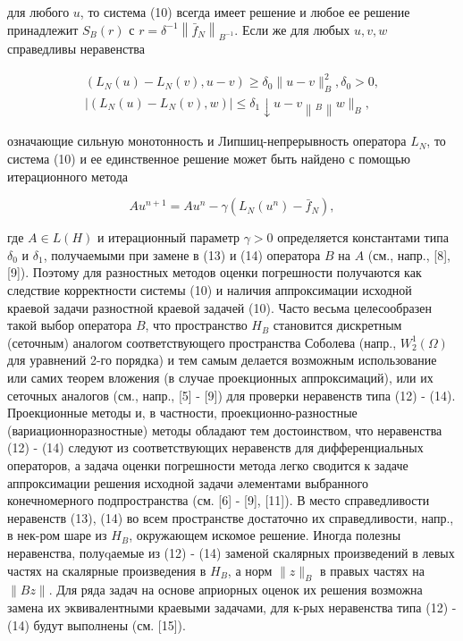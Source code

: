 \documentclass[10pt]{article}
\begin{document}
для любого $u$, то система (10) всегда имеет решение и любое ее решение принадлежит $S_{B}(r)$ с $r=\delta^{-1}\left\|\bar{f}_{N}\right\|_{B^{-1}}$. Если же для любых $u, v, w$ справедливы неравенства



\[

\begin{gathered}

\left(L_{N}(u)-L_{N}(v), u-v\right) \geqslant \delta_{0}\|u-v\|_{B}^{2}, \delta_{0}>0, \\

\left|\left(L_{N}(u)-L_{N}(v), w\right)\right| \leqslant \delta_{1} \downarrow u-v\left\|_{B}\right\| w \|_{B},

\end{gathered}

\]



означающие сильную монотонность и Липшиц-непрерывность оператора $L_{N}$, то система (10) и ее единственное решение может быть найдено с помощью итерационного метода



\[

A u^{n+1}=A u^{n}-\gamma\left(L_{N}\left(u^{n}\right)-\bar{f}_{N}\right),

\]



где $A \in L(H)$ и итерационный параметр $\gamma>0$ определяется константами типа $\delta_{0}$ и $\delta_{1}$, получаемыми при замене в (13) и (14) оператора $B$ на $A$ (см., напр., [8], [9]). Поэтому для разностных методов оценки погрешности получаются как следствие корректности системы (10) и наличия аппроксимации исходной краевой задачи разностной краевой задачей (10). Часто весьма целесообразен такой выбор оператора $B$, что пространство $H_{B}$ становится дискретным (сеточным) аналогом соответствующего пространства Соболева (напр., $W_{2}^{1}(\Omega)$ для уравнений 2-го порядка) и тем самым делается возможным использование или самих теорем вложения (в случае проекционных аппроксимаций), или их сеточных аналогов (см., напр., [5] - [9]) для проверки неравенств типа (12) - (14). Проекционные методы и, в частности, проекционно-разностные (вариационноразностные) методы обладают тем достоинством, что неравенства (12) - (14) следуют из соответствующих неравенств для дифференциальных операторов, а задача оценки погрешности метода легко сводится к задаче аппроксимации решения исходной задачи әлементами выбранного конечномерного подпространства (см. [6] - [9], [11]). В место справедливости неравенств (13), (14) во всем пространстве достаточно их справедливости, напр., в нек-ром шаре из $H_{B}$, окружающем искомое решение. Иногда полезны неравенства, полуqаемые из (12) - (14) заменой скалярных произведений в левых частях на скалярные произведения в $H_{B}$, а норм $\|z\|_{B}$ в правых частях на $\|B z\|$. Для ряда задач на основе априорных оценок их решения возможна замена их эквивалентными краевыми задачами, для к-рых неравенства типа (12) - (14) будут выполнены (см. [15]).
\end{document}
